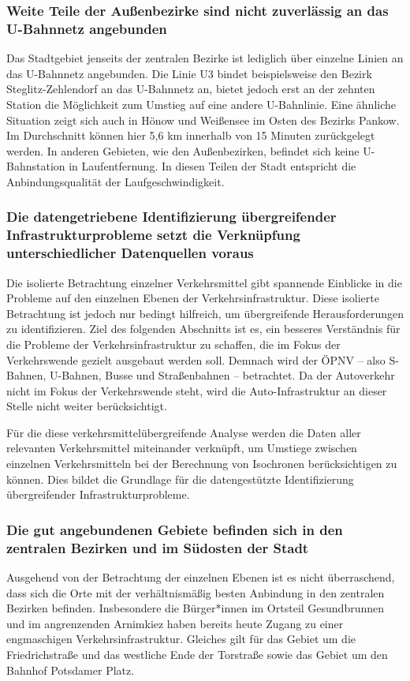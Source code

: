 \subsubsection{Weite Teile der Außenbezirke sind nicht zuverlässig an das U-Bahnnetz angebunden}
Das Stadtgebiet jenseits der zentralen Bezirke ist lediglich über einzelne Linien an das U-Bahnnetz angebunden. Die Linie U3 bindet beispielsweise den Bezirk Steglitz-Zehlendorf an das U-Bahnnetz an, bietet jedoch erst an der zehnten Station die Möglichkeit zum Umstieg auf eine andere U-Bahnlinie. Eine ähnliche Situation zeigt sich auch in Hönow und Weißensee im Osten des Bezirks Pankow. Im Durchschnitt können hier 5,6 km innerhalb von 15 Minuten zurückgelegt werden. In anderen Gebieten, wie den Außenbezirken, befindet sich keine U-Bahnstation in Laufentfernung. In diesen Teilen der Stadt entspricht die Anbindungsqualität der Laufgeschwindigkeit.






\subsubsection{Die datengetriebene Identifizierung übergreifender Infrastrukturprobleme setzt die Verknüpfung unterschiedlicher Datenquellen voraus}
Die isolierte Betrachtung einzelner Verkehrsmittel gibt spannende Einblicke in die Probleme auf den einzelnen Ebenen der Verkehrsinfrastruktur. Diese isolierte Betrachtung ist jedoch nur bedingt hilfreich, um übergreifende Herausforderungen zu identifizieren. Ziel des folgenden Abschnitts ist es, ein besseres Verständnis für die Probleme der Verkehrsinfrastruktur zu schaffen, die im Fokus der Verkehrswende gezielt ausgebaut werden soll. Demnach wird der ÖPNV – also S-Bahnen, U-Bahnen, Busse und Straßenbahnen – betrachtet. Da der Autoverkehr nicht im Fokus der Verkehrswende steht, wird die Auto-Infrastruktur an dieser Stelle nicht weiter berücksichtigt.

Für die diese verkehrsmittelübergreifende Analyse werden die Daten aller relevanten Verkehrsmittel miteinander verknüpft, um Umstiege zwischen einzelnen Verkehrsmitteln bei der Berechnung von Isochronen berücksichtigen zu können. Dies bildet die Grundlage für die datengestützte Identifizierung übergreifender Infrastrukturprobleme.







\subsubsection{Die gut angebundenen Gebiete befinden sich in den zentralen Bezirken und im Südosten der Stadt}
Ausgehend von der Betrachtung der einzelnen Ebenen ist es nicht überraschend, dass sich die Orte mit der verhältnismäßig besten Anbindung in den zentralen Bezirken befinden. Insbesondere die Bürger*innen im Ortsteil Gesundbrunnen und im angrenzenden Arnimkiez haben bereits heute Zugang zu einer engmaschigen Verkehrsinfrastruktur. Gleiches gilt für das Gebiet um die Friedrichstraße und das westliche Ende der Torstraße sowie das Gebiet um den Bahnhof Potsdamer Platz.


